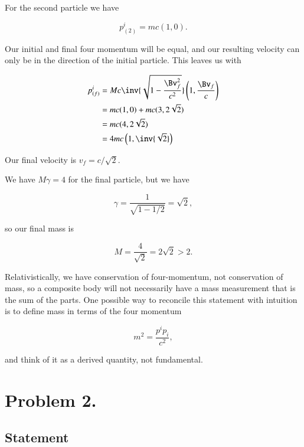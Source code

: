 For the second particle we have

\begin{equation}\label{eqn:relElectroDynProblemSet2:90}
p_{(2)}^i = m c ( 1, 0 ).
\end{equation}

Our initial and final four momentum will be equal, and our resulting velocity can only be in the direction of the initial particle.  This leaves us with

\begin{align*}
p_{(f)}^i
&= M c \inv{\sqrt{1 - \frac{\Bv_f^2}{c^2}}} \left( 1, \frac{\Bv_f}{c} \right) \\
&= m c ( 1, 0 ) + m c ( 3, 2 \sqrt{2} )  \\
&= m c ( 4, 2 \sqrt{2} ) \\
&= 4 m c \left( 1, \inv{\sqrt{2}} \right)
\end{align*}

Our final velocity is $v_f = c/\sqrt{2}$.

We have $M \gamma = 4$ for the final particle, but we have

\begin{equation}\label{eqn:relElectroDynProblemSet2:110}
\gamma = \frac{1}{\sqrt{1 - 1/2}} = \sqrt{2},
\end{equation}

so our final mass is

\begin{equation}\label{eqn:relElectroDynProblemSet2:130}
M = \frac{4}{\sqrt{2}} = 2 \sqrt{2} > 2.
\end{equation}

Relativistically, we have conservation of four-momentum, not conservation of mass, so a composite body will not necessarily have a mass measurement that is the sum of the parts.  One possible way to reconcile this statement with intuition is to define mass in terms of the four momentum

\begin{equation}\label{eqn:relElectroDynProblemSet2:130b}
m^2 = \frac{p^i p_i}{c^2},
\end{equation}

and think of it as a derived quantity, not fundamental.

\section{Problem 2.}
\subsection{Statement}

